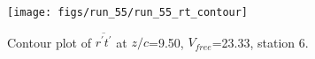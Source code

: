 \begin{figure}[H]
\centering
\texttt{[image: figs/run\_55/run\_55\_rt\_contour]}
\caption{Contour plot of $\overline{r^\prime t^\prime}$ at $z/c$=9.50, $V_{free}$=23.33, station 6.}
\label{fig:run_55_rt_contour}
\end{figure}


